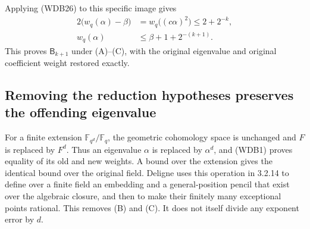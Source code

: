 Applying (WDB26) to this specific image gives
\[
 \begin{split}
 2\bigl(w_q(\alpha)-\beta\bigr)
 &=w_q\bigl((c\alpha)^2\bigr)\le2+2^{-k},\\
 w_q(\alpha)&\le\beta+1+2^{-(k+1)}.
 \end{split}
 \tag{WDB29}
\]
This proves \(\mathsf B_{k+1}\) under (A)--(C), with the original
eigenvalue and original coefficient weight restored exactly.

\subsection{Removing the reduction hypotheses preserves the offending eigenvalue}

For a finite extension \(\mathbb F_{q^d}/\mathbb F_q\), the
geometric cohomology space is unchanged and \(F\) is replaced by
\(F^d\). Thus an eigenvalue \(\alpha\) is replaced by
\(\alpha^d\), and (WDB1) proves equality of its old and new
weights. A bound over the extension gives the identical bound over
the original field. Deligne uses this operation in 3.2.14 to define
over a finite field an embedding and a general-position pencil that
exist over the algebraic closure, and then to make their finitely
many exceptional points rational. This removes (B) and (C). It does
not itself divide any exponent error by \(d\).

